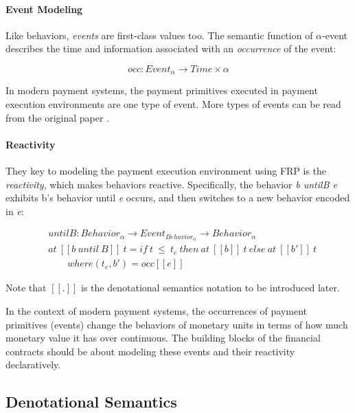 \paragraph{Event Modeling}

Like behaviors, \textit{events} are first-class values too. The semantic function of $\alpha$-event
describes the time and information associated with an \textit{occurrence} of the event:

\begin{equation}
    occ : Event_{\alpha} \rightarrow Time \times \alpha
\end{equation}

In modern payment systems, the payment primitives executed in payment execution environments are
one type of event. More types of events can be read from the original paper .

\paragraph{Reactivity}

They key to modeling the payment execution environment using FRP is the \textit{reactivity}, which
makes behaviors reactive. Specifically, the behavior \textit{b untilB e} exhibits b's behavior
until \textit{e} occurs, and then switches to a new behavior encoded in \textit{e}:

\begin{equation}
    \begin{split}
    &untilB : Behavior_{\alpha} \rightarrow Event_{Behavior_{\alpha}} \rightarrow Behavior_{\alpha} \\
    &at\ [\![b\ until\ B]\!]\ t = if\ t\ \leq\ t_{e}\ then\ at\ [\![b]\!]\ t\ else\ at\ [\![b']\!]\ t \\
    &\qquad where (t_e, b') = occ[\![e]\!]
    \end{split}
\end{equation}

Note that $[\![.]\!]$ is the denotational semantics notation to be introduced later.

In the context of modern payment systems, the occurrences of payment primitives (events) change the
behaviors of monetary units in terms of how much monetary value it has over continuous. The
building blocks of the financial contracts should be about modeling these events and their
reactivity declaratively.

\subsection{Denotational Semantics}

